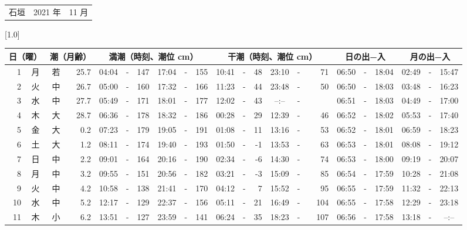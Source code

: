 \documentclass[12pt,a4j]{jsarticle}
\begin{document}
 \begin{table}[htbp]
 \begin{center}
 \begin{tabular}{lcc}
 \LARGE{石垣}  & \large{2021 年} & \large{11 月} \\
 \end{tabular}
 \end{center}
 \begin{center}
    \scalebox{0.7}[1.0]{
    \begin{tabular}{|rc|cr|ccrccr|ccrccr|ccc|ccc|}
    \hline
    \multicolumn{2}{|c|}{日（曜）} & \multicolumn{2}{c|}{潮（月齢）} & \multicolumn{6}{c|}{満潮（時刻、潮位 cm）} & \multicolumn{6}{c|}{干潮（時刻、潮位 cm）} & \multicolumn{3}{c|}{日の出−入} &  \multicolumn{3}{c|}{月の出−入}\\
 \hline
 1 & 月 & 若 & 25.7 &  04:04 &-& 147 &  17:04 &-& 155 &  10:41 &-&  48 &  23:10 &-&  71 & 06:50 & -& 18:04 & 02:49 & -& 15:47 \\
 2 & 火 & 中 & 26.7 &  05:00 &-& 160 &  17:32 &-& 166 &  11:23 &-&  44 &  23:48 &-&  50 & 06:50 & -& 18:03 & 03:48 & -& 16:23 \\
 3 & 水 & 中 & 27.7 &  05:49 &-& 171 &  18:01 &-& 177 &  12:02 &-&  43 &  --:-- &-&~~~~~ & 06:51 & -& 18:03 & 04:49 & -& 17:00 \\
 4 & 木 & 大 & 28.7 &  06:36 &-& 178 &  18:32 &-& 186 &  00:28 &-&  29 &  12:39 &-&  46 & 06:52 & -& 18:02 & 05:53 & -& 17:40 \\
 5 & 金 & 大 &  0.2 &  07:23 &-& 179 &  19:05 &-& 191 &  01:08 &-&  11 &  13:16 &-&  53 & 06:52 & -& 18:01 & 06:59 & -& 18:23 \\
 6 & 土 & 大 &  1.2 &  08:11 &-& 174 &  19:40 &-& 193 &  01:50 &-&  -1 &  13:53 &-&  63 & 06:53 & -& 18:01 & 08:08 & -& 19:12 \\
 7 & 日 & 中 &  2.2 &  09:01 &-& 164 &  20:16 &-& 190 &  02:34 &-&  -6 &  14:30 &-&  74 & 06:53 & -& 18:00 & 09:19 & -& 20:07 \\
 8 & 月 & 中 &  3.2 &  09:55 &-& 151 &  20:56 &-& 182 &  03:21 &-&  -3 &  15:09 &-&  85 & 06:54 & -& 17:59 & 10:28 & -& 21:08 \\
 9 & 火 & 中 &  4.2 &  10:58 &-& 138 &  21:41 &-& 170 &  04:12 &-&   7 &  15:52 &-&  95 & 06:55 & -& 17:59 & 11:32 & -& 22:13 \\
10 & 水 & 中 &  5.2 &  12:17 &-& 129 &  22:37 &-& 156 &  05:11 &-&  21 &  16:49 &-& 104 & 06:55 & -& 17:58 & 12:29 & -& 23:18 \\
11 & 木 & 小 &  6.2 &  13:51 &-& 127 &  23:59 &-& 141 &  06:24 &-&  35 &  18:23 &-& 107 & 06:56 & -& 17:58 & 13:18 & -& --:-- \\

\end{tabular}}
\end{center}
\end{table}
\end{document}

